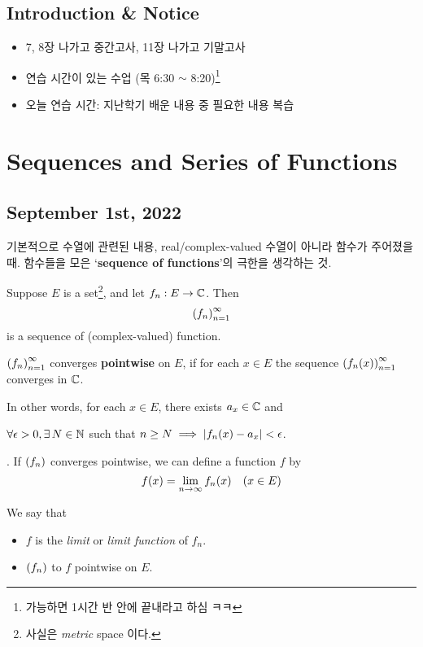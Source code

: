 \section*{Introduction \& Notice}

\begin{itemize}
    \item 7, 8장 나가고 중간고사, 11장 나가고 기말고사
    \item 연습 시간이 있는 수업 (목 6:30 \(\sim\) 8:20)\footnote{가능하면 1시간 반 안에 끝내라고 하심 ㅋㅋ}
    \item 오늘 연습 시간: 지난학기 배운 내용 중 필요한 내용 복습
\end{itemize}

\chapter{Sequences and Series of Functions}

\section*{September 1st, 2022}

기본적으로 수열에 관련된 내용, real/complex-valued 수열이 아니라 함수가 주어졌을 때. 함수들을 모은 `\textbf{sequence of functions}'의 극한을 생각하는 것.

\medskip

Suppose \(E\) is a set\footnote{사실은 \textit{metric} space 이다.}, and let \(f_n: E \rightarrow \mathbb{C}\). Then
\[
    \left( f_n \right)_{n=1}^\infty
\]
is a sequence of (complex-valued) function.

  \(\left( f_n \right)_{n = 1}^\infty\) converges \textbf{pointwise} on \(E\), if for each \(x \in E\) the sequence \(\left( f_n(x) \right)_{n=1}^\infty\) converges in \(\mathbb{C}\).

In other words, for each \(x \in E\), there exists \(a_x \in \mathbb{C}\) and
\begin{center}
    \(\forall \epsilon > 0, \exists N \in \N\) such that \(n \geq N \implies \left| f_n(x) - a_x \right| < \epsilon\).
\end{center}

. If \(\left( f_n \right)\) converges pointwise, we can define a function \(f\) by
\[
    f(x) = \lim_{n \rightarrow \infty} f_n(x) \quad (x\in E)
\]

We say that
\begin{itemize}
    \item \(f\) is the \textit{limit} or \textit{limit function} of \(f_n\).
    \item \(\left( f_n \right)\) to \(f\) pointwise on \(E\).
\end{itemize}

